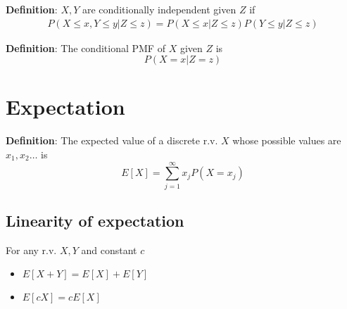 \begin{framed}
   \textbf{Definition}: $X, Y$ are conditionally independent given $Z$ if
   \begin{align*}
      P(X \leq x, Y \leq y | Z \leq z) = P(X \leq x | Z \leq z) P(Y \leq y | Z \leq z) 
   \end{align*}
\end{framed}

\begin{framed}
   \textbf{Definition}: The conditional PMF of $X$ given $Z $ is
   \[
     P(X = x | Z = z)
   \] 
\end{framed}

\section{Expectation}

\begin{framed}
   \textbf{Definition}: The expected value of a discrete r.v. $X$ whose possible values are $x_1, x_2 \hdots$ is
   \[
      E[X] = \sum_{j =1}^{\infty} x_j P(X = x_j)
   \] 
\end{framed}

\subsection{Linearity of expectation}

\begin{framed}
   For any r.v. $X, Y$ and constant $c$
   \begin{itemize}
      \item $E[  X + Y ] = E[X] + E[Y]$
      \item $E[  cX] = c E[X]$
   \end{itemize}
\end{framed}

